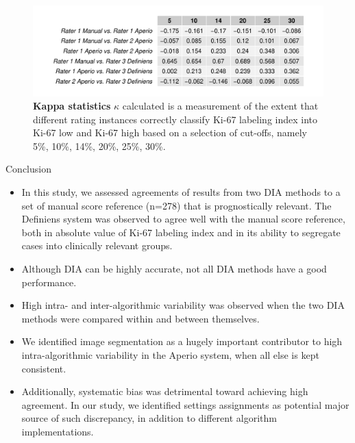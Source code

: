 \documentclass[final]{beamer}
\newlength{\onecolwid}
\begin{document}
\begin{frame}[t]
\begin{columns}[t]
\begin{column}{\onecolwid}

\begin{block}{}

\begin{figure}
\includegraphics[width = \linewidth]{kappaStat}
\centering
\caption{
{\bf Kappa statistics}
$\kappa$ calculated is a measurement of the extent that different rating instances correctly classify Ki-67 labeling index into Ki-67 low and Ki-67 high based on a selection of cut-offs, namely 5\%, 10\%, 14\%, 20\%, 25\%, 30\%.
}
\label{kappaStat}
\end{figure}

\end{block}


\begin{block}{Conclusion}

\begin{itemize}
\item In this study, we assessed agreements of results from two DIA methods to a set of manual score reference (n=278) that is prognostically relevant. The Definiens system was observed to agree well with the manual score reference, both in absolute value of Ki-67 labeling index and in its ability to segregate cases into clinically relevant groups.
\item Although DIA can be highly accurate, not all DIA methods have a good performance.
\item High intra- and inter-algorithmic variability was observed when the two DIA methods were compared within and between themselves.
\item We identified image segmentation as a hugely important contributor to high intra-algorithmic variability in the Aperio system, when all else is kept consistent.
\item Additionally, systematic bias was detrimental toward achieving high agreement. In our study, we identified settings assignments as potential major source of such discrepancy, in addition to different algorithm implementations.
\end{itemize}


\end{block}
\end{column}
\end{columns}
\end{frame}
\end{document}

